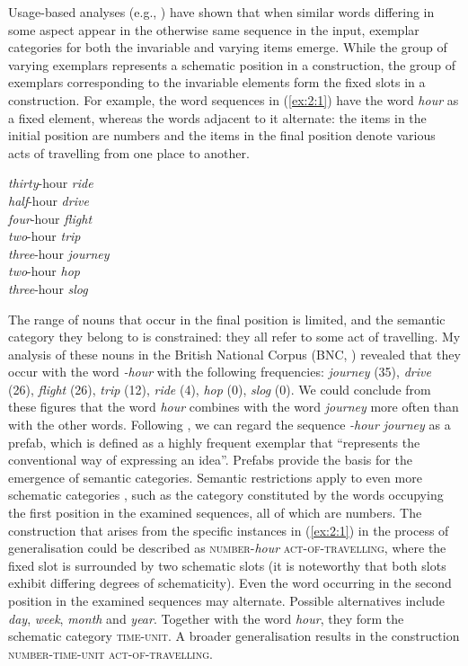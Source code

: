 Usage-based analyses (e.g., \citealt{boas-2003, lieven-etal-2003, goldberg-etal-2004, dabrowska-lieven-2005, bybee-eddington, boyd-goldberg-2011}) have shown that when similar words differing in some aspect appear in the otherwise same sequence in the input, exemplar categories for both the invariable and varying items emerge. While the group of varying exemplars represents a schematic position in a construction, the group of exemplars corresponding to the invariable elements form the fixed slots in a construction. For example, the word sequences in (\ref{ex:2:1}) have the word \textit{hour} as a fixed element, whereas the words adjacent to it alternate: the items in the initial position are numbers and the items in the final position denote various acts of travelling from one place to another.

\ea
	\label{ex:2:1}
	\textit{thirty}-hour \textit{ride}\\
	\textit{half}-hour \textit{drive}\\
	\textit{four}-hour \textit{flight}\\
	\textit{two}-hour \textit{trip}\\
	\textit{three}-hour \textit{journey}\\
	\textit{two}-hour \textit{hop}\\
	\textit{three}-hour \textit{slog}\hfill\hbox{\citep[data from][16--17]{hoey-lexical-2005}}
\z

\noindent The range of nouns that occur in the final position is limited, and the semantic category they belong to is constrained: they all refer to some act of travelling. My analysis of these nouns in the British National Corpus (BNC, \mbox{\citealt{bnc})} revealed that they occur with the word \textit{-hour} with the following frequencies: \textit{journey} (35), \textit{drive} (26), \textit{flight} (26), \textit{trip} (12), \textit{ride} (4), \textit{hop} (0), \textit{slog} (0). We could conclude from these figures that the word \textit{hour} combines with the word \textit{journey} more often than with the other words. Following \citet[][81]{bybee-book-2010}, we can regard the sequence \textit{-hour journey} as a prefab, which is defined as a highly frequent exemplar that ``represents the conventional way of expressing an idea''. Prefabs provide the basis for the emergence of semantic categories. Semantic restrictions apply to even more schematic categories \citep[cf.][81]{bybee-book-2010}, such as the category constituted by the words occupying the first position in the examined sequences, all of which are numbers. The construction that arises from the specific instances in (\ref{ex:2:1}) in the process of generalisation could be described as \textsc{number}-\textit{hour} \textsc{act-of-travelling}, where the fixed slot is surrounded by two schematic slots (it is noteworthy that both slots exhibit differing degrees of schematicity). Even the word occurring in the second position in the examined sequences may alternate. Possible alternatives include \textit{day}, \textit{week}, \textit{month} and \textit{year}. Together with the word \textit{hour}, they form the schematic category \textsc{time-unit}. A broader generalisation results in the construction \textsc{number-time-unit act-of-travelling}. 

